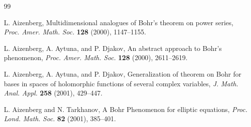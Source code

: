 \documentclass[a4paper,11pt, reqno]{amsart}
\theoremstyle{definition}
\begin{document}
\begin{thebibliography}{99}
	
	
	 {\sc L. Aizenberg}, Multidimensional analogues of Bohr's theorem on power series, \textit{Proc. Amer. Math. Soc.} {\bf 128} (2000), 1147--1155.
	
	 {\sc L. Aizenberg, A. Aytuna}, and {\sc P. Djakov}, An abstract approach to Bohr's phenomenon, {\it Proc. Amer. Math. Soc.} {\bf 128} (2000), 2611--2619.
	
	
			 {\sc L. Aizenberg, A. Aytuna},  and {\sc P. Djakov}, Generalization of theorem on Bohr for bases in spaces of holomorphic functions of several complex variables, 		{\it J. Math. Anal. Appl.} {\bf  258} (2001), 429--447.
	
			 {\sc L. Aizenberg}  and {\sc N. Tarkhanov}, A Bohr Phenomenon for elliptic equations, {\it Proc. Lond. Math. Soc.} {\bf  82} (2001), 385--401.
	
	
	
	
	
	
	

\end{thebibliography}
\end{document}
